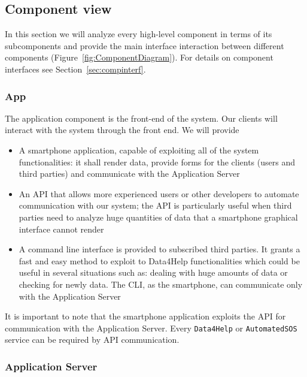 \documentclass[../DD0.tex]{subfiles}
\begin{document}
  \subsection{Component view}
  \label{sec:compview}

    In this section we will analyze every high-level component in terms of its subcomponents and provide the main interface interaction between different components (Figure~\ref{fig:ComponentDiagram}). For details on component interfaces see Section~\ref{sec:compinterf}.

      \subsubsection{App}

        The application component is the front-end of the system. Our clients will interact with the system through the front end. We will provide
        \begin{itemize}
          \item A smartphone application, capable of exploiting all of the system functionalities: it shall render data, provide forms for the clients (users and third parties) and communicate with the Application Server
          \item An API that allows more experienced users or other developers to automate communication with our system; the API is particularly useful when third parties need to analyze huge quantities of data that a smartphone graphical interface cannot render
          \item A command line interface is provided to subscribed third parties. It grants a fast and easy method to exploit to Data4Help functionalities which could be useful in several situations such as: dealing with huge amounts of data or checking for newly data.
          The CLI, as the smartphone, can communicate only with the Application Server
        \end{itemize}

        It is important to note that the smartphone application exploits the API for communication with the Application Server. Every \texttt{Data4Help} or \texttt{AutomatedSOS} service can be required by API communication.

      \subsubsection{Application Server}
      \label{sec:applserverinterf}
\end{document}
